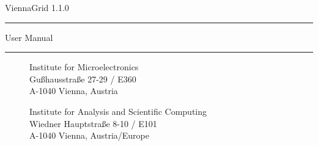 
\begin{titlepage}

\vspace*{3cm}
\Huge{ViennaGrid 1.1.0} 
\rule[0.0cm]{8.9cm}{0.05cm}
\begin{flushright}
\Large{User Manual}
\end{flushright}

\vspace{11.2cm}
\rule[0.0cm]{16.0cm}{0.05cm}
\begin{figure}[!ht]
   \vspace{-1.0cm}
   \begin{minipage}{2cm}
   \end{minipage}
   \hfill
   \begin{minipage}{9.5cm}
      \begin{flushright}
      \vspace{0.2cm}
      Institute for Microelectronics\\
      Gu\ss hausstra\ss e 27-29 / E360\\
      A-1040 Vienna, Austria\\
      \end{flushright}
      \vspace{0.1cm}
      \begin{flushright}
      Institute for Analysis and Scientific Computing\\
      Wiedner Hauptstra\ss e 8-10 / E101\\
      A-1040 Vienna, Austria/Europe\\
      \end{flushright}
   \end{minipage}   
   \hfill   
   \begin{minipage}{2.6cm}
       \\
      \hspace*{0.3cm}
   \end{minipage}
\end{figure}

\end{titlepage}


